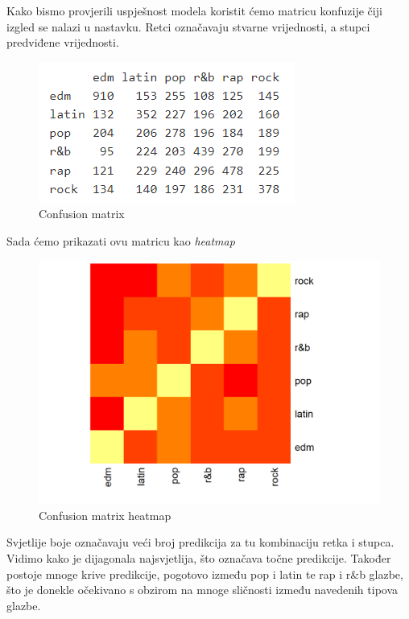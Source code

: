 	Kako bismo provjerili uspješnost modela koristit ćemo matricu konfuzije čiji izgled se nalazi u nastavku. Retci označavaju stvarne vrijednosti, a stupci predviđene vrijednosti.
	
	\begin{figure}[H]
		\includegraphics[scale=0.9]{slike/confMatrix.png}
		\centering
		\caption{Confusion matrix}
		
	\end{figure}
	
	Sada ćemo prikazati ovu matricu kao \textit{heatmap}
	
	\begin{figure}[H]
		\includegraphics[scale=0.9]{slike/heatmap.png}
		\centering
		\caption{Confusion matrix heatmap}
		
	\end{figure}
	Svjetlije boje označavaju veći broj predikcija za tu kombinaciju retka i stupca. Vidimo kako je dijagonala najsvjetlija, što označava točne predikcije. Također postoje mnoge krive predikcije, pogotovo između pop i latin te rap i r\&b glazbe, što je donekle očekivano s obzirom na mnoge sličnosti između navedenih tipova glazbe.
	
\eject



